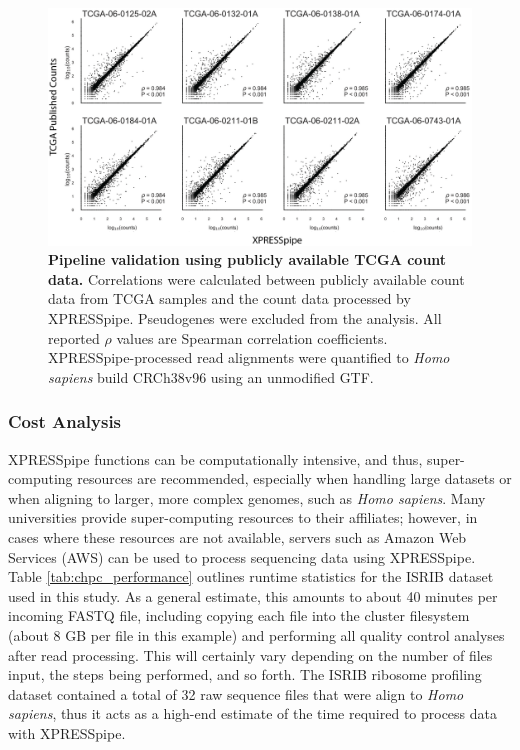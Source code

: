 \documentclass[10pt, oneside]{article}
\begin{document}
\begin{figure}
\centering
  \includegraphics[width=180mm]{figures/xpresspipe_figure4.png}
  \caption{\textbf{Pipeline validation using publicly available TCGA count data.} Correlations were calculated between publicly available count data from TCGA samples and the count data processed by XPRESSpipe. Pseudogenes were excluded from the analysis. All reported $\rho$ values are Spearman correlation coefficients. XPRESSpipe-processed read alignments were quantified to \textit{Homo sapiens} build CRCh38v96 using an unmodified GTF.}
  \label{fig:figure4}
\end{figure}


\subsubsection{Cost Analysis}
XPRESSpipe functions can be computationally intensive, and thus, super-computing resources are recommended, especially when handling large datasets or when aligning to larger, more complex genomes, such as \textit{Homo sapiens}. Many universities provide super-computing resources to their affiliates; however, in cases where these resources are not available, servers such as Amazon Web Services (AWS) \cite{aws} can be used to process sequencing data using XPRESSpipe. Table \ref{tab:chpc_performance} outlines runtime statistics for the ISRIB dataset used in this study. As a general estimate, this amounts to about 40 minutes per incoming FASTQ file, including copying each file into the cluster filesystem (about 8 GB per file in this example) and performing all quality control analyses after read processing. This will certainly vary depending on the number of files input, the steps being performed, and so forth. The ISRIB ribosome profiling dataset contained a total of 32 raw sequence files that were align to \textit{Homo sapiens}, thus it acts as a high-end estimate of the time required to process data with XPRESSpipe. \par
\end{document}
